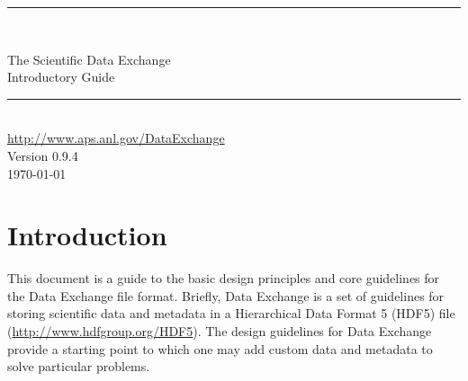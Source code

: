\documentclass[usletter,11pt]{article}
\newcommand{\HRule}{{\color{brightOrange} \rule{\linewidth}{0.5mm}}}
\begin{document}
\pagestyle{empty}

\begin{center}
\vspace*{2.5cm}

\HRule \\[0.6cm]
\begin{spacing}{2.0}

{\color{softBlue} \Huge \sffamily The Scientific Data Exchange}\\[0.15cm]
{\color{softBlue} \Huge \sffamily Introductory Guide}\\[0.15cm]
\end{spacing}
\HRule \\[1.0cm]
{\Large \color{softBlue} \sffamily \url{http://www.aps.anl.gov/DataExchange}}\\[1.0cm]
{\Large \color{softBlue} \sffamily Version 0.9.4}\\[1.0cm]
{\Large \color{softBlue} \sffamily \today}

\end{center}
\newpage


\newpage

\pagestyle{fancy}

\tableofcontents

\newpage

\setcounter{page}{1}

\section{Introduction}

This document is a guide to the basic design principles and core guidelines
for the Data Exchange file format. Briefly, Data Exchange is a set of
guidelines for storing scientific data and metadata in a Hierarchical Data
Format 5 (HDF5) file (\url{http://www.hdfgroup.org/HDF5}). The design
guidelines for Data Exchange provide a starting point to which one
may add custom data and metadata to solve particular problems. 
\end{document}
